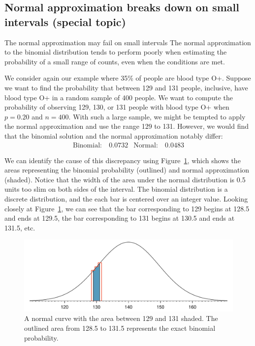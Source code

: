 \subsection{Normal approximation breaks down on small intervals (special topic)}

\begin{onebox}{The normal approximation may fail on small intervals}
{The normal approximation to the binomial distribution tends to perform poorly when estimating the probability of a small range of counts, even when the conditions are met.}
\end{onebox}

We consider again our example where 35\% of people are blood type O+.  Suppose we want to find the probability that between 129 and 131 people, inclusive, have blood type O+ in a random sample of 400 people.  We want to compute the probability of observing 129, 130, or 131 people with blood type O+ when $p=0.20$ and $n=400$.  With such a large sample, we might be tempted to apply the normal approximation and use the range 129 to 131. However, we would find that the binomial solution and the normal approximation notably differ:
\begin{align*}
\text{Binomial:}&\ 0.0732
&\text{Normal:}&\ 0.0483
\end{align*}
\D{\newpage}

We can identify the cause of this discrepancy using Figure~\ref{normApproxToBinomFail}, which shows the areas representing the binomial probability (outlined) and normal approximation (shaded). Notice that the width of the area under the normal distribution is 0.5 units too slim on both sides of the interval. The binomial distribution is a discrete distribution, and the each bar is centered over an integer value. Looking closely at Figure~\ref{normApproxToBinomFail}, we can see that the bar corresponding to 129 begins at 128.5 and ends at 129.5, the bar corresponding to 131 begins at 130.5 and ends at 131.5, etc.

\begin{figure}[h]
\centering
\includegraphics[width=\textwidth]{ch_distributions/figures/normApproxToBinomFail/normApproxToBinomFail-n400-p35}
\caption{A normal curve with the area between 129 and 131 shaded. The outlined area from 128.5 to 131.5 represents the exact binomial probability.}
\label{normApproxToBinomFail}
\end{figure}


